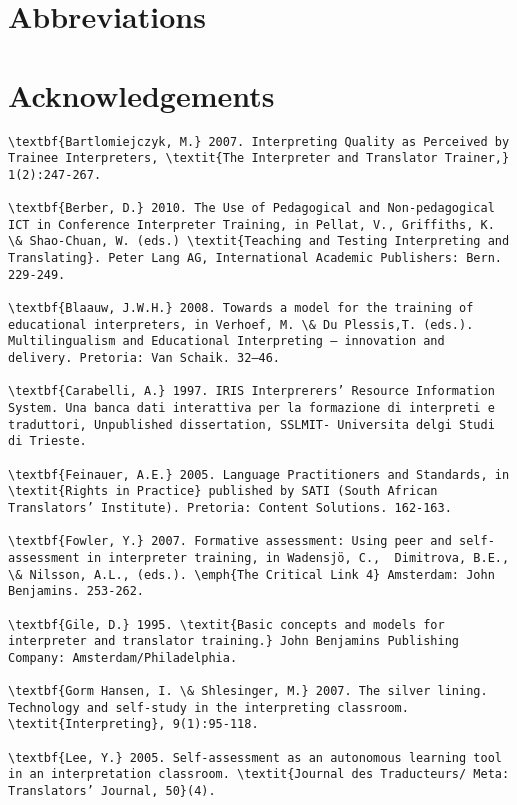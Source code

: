 \documentclass[output=paper]{langsci/langscibook}
\begin{document}
\section*{Abbreviations}
\section*{Acknowledgements}

{\sloppy
	\printbibliography[heading=subbibliography,notkeyword=this]}
\begin{verbatim}
\textbf{Bartlomiejczyk, M.} 2007. Interpreting Quality as Perceived by Trainee Interpreters, \textit{The Interpreter and Translator Trainer,} 1(2):247-267.

\textbf{Berber, D.} 2010. The Use of Pedagogical and Non-pedagogical ICT in Conference Interpreter Training, in Pellat, V., Griffiths, K. \& Shao-Chuan, W. (eds.) \textit{Teaching and Testing Interpreting and Translating}. Peter Lang AG, International Academic Publishers: Bern. 229-249.

\textbf{Blaauw, J.W.H.} 2008. Towards a model for the training of educational interpreters, in Verhoef, M. \& Du Plessis,T. (eds.). Multilingualism and Educational Interpreting – innovation and delivery. Pretoria: Van Schaik. 32–46.

\textbf{Carabelli, A.} 1997. IRIS Interprerers’ Resource Information System. Una banca dati interattiva per la formazione di interpreti e traduttori, Unpublished dissertation, SSLMIT- Universita delgi Studi di Trieste. 

\textbf{Feinauer, A.E.} 2005. Language Practitioners and Standards, in \textit{Rights in Practice} published by SATI (South African Translators’ Institute). Pretoria: Content Solutions. 162-163.

\textbf{Fowler, Y.} 2007. Formative assessment: Using peer and self-assessment in interpreter training, in Wadensjö, C.,  Dimitrova, B.E., \& Nilsson, A.L., (eds.). \emph{The Critical Link 4} Amsterdam: John Benjamins. 253-262.

\textbf{Gile, D.} 1995. \textit{Basic concepts and models for interpreter and translator training.} John Benjamins Publishing Company: Amsterdam/Philadelphia.

\textbf{Gorm Hansen, I. \& Shlesinger, M.} 2007. The silver lining. Technology and self-study in the interpreting classroom. \textit{Interpreting}, 9(1):95-118. 

\textbf{Lee, Y.} 2005. Self-assessment as an autonomous learning tool in an interpretation classroom. \textit{Journal des Traducteurs/ Meta: Translators’ Journal, 50}(4).


\end{verbatim}
\end{document}
